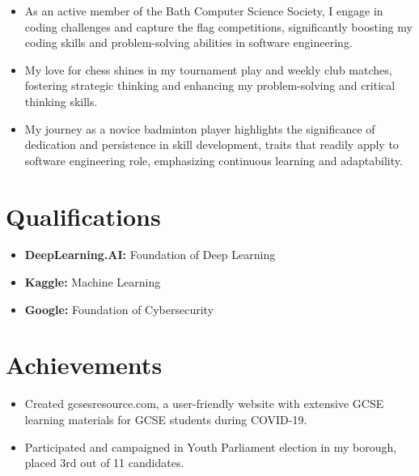 \documentclass[11pt,a4paper,sans]{moderncv}        %
\begin{document}
\begin{multicols}{2}
\begin{itemize}
\item{As an active member of the Bath Computer Science Society, I engage in coding challenges and capture the flag competitions, significantly boosting my coding skills and problem-solving abilities in software engineering.}
\vspace{5pt}

\item{My love for chess shines in my tournament play and weekly club matches, fostering strategic thinking and enhancing my problem-solving and critical thinking skills. }
\vspace{5pt}

\item{My journey as a novice badminton player highlights the significance of dedication and persistence in skill development, traits that readily apply to software engineering role, emphasizing continuous learning and adaptability. }

\end{itemize}

\section{Qualifications}
\begin{itemize}
\item \textbf{DeepLearning.AI:} Foundation of Deep Learning

\vspace{5pt}

\item \textbf{Kaggle:} Machine Learning

\vspace{5pt}

\item \textbf{Google:} Foundation of Cybersecurity 

\end{itemize}


\section{Achievements}
\begin{itemize}


\item{Created gcsesresource.com, a user-friendly website with extensive GCSE learning materials for GCSE students during COVID-19.}

\vspace{5pt}

\item{Participated and campaigned in Youth Parliament election in my borough, placed 3rd out of 11 candidates.}


\end{itemize}
\end{multicols}
\end{document}
